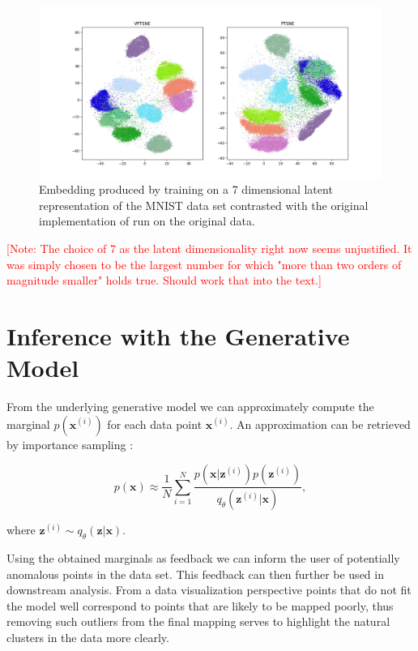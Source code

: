 \begin{figure}[!htb]
  \centering
  \includegraphics[width=\textwidth]{images/vptsne_vs_original_ptsne_7.png}
  \caption{Embedding produced by training on a 7 dimensional latent representation of the MNIST data set contrasted with the original implementation of \cite{parametric_tsne} run on the original data.}
  \label{fig:hidden_layer}
\end{figure}

\textcolor{red}{[Note: The choice of 7 as the latent dimensionality right now seems unjustified. It was simply chosen to be the largest number for which "more than two orders of magnitude smaller" holds true. Should work that into the text.]}

\section{Inference with the Generative Model}
\label{subsection:applications_of_the_inference_network}

From the underlying generative model we can approximately compute the marginal $p(\mathbf{x}^{(i)})$ for each data point $\mathbf{x}^{(i)}$. An approximation can be retrieved by importance sampling \citep{stochastic_backpropagation}:

$$p(\mathbf{x}) \approx \frac{1}{N} \sum_{i=1}^{N} \frac{p(\mathbf{x} \vert \mathbf{z}^{(i)}) p(\mathbf{z}^{(i)})}{q_{\theta}(\mathbf{z}^{(i)} \vert \mathbf{x})},$$

where $\mathbf{z}^{(i)} \sim q_{\theta}(\mathbf{z} \vert \mathbf{x})$.

Using the obtained marginals as feedback we can inform the user of potentially anomalous points in the data set. This feedback can then further be used in downstream analysis. From a data visualization perspective points that do not fit the model well correspond to points that are likely to be mapped poorly, thus removing such outliers from the final mapping serves to highlight the natural clusters in the data more clearly.

